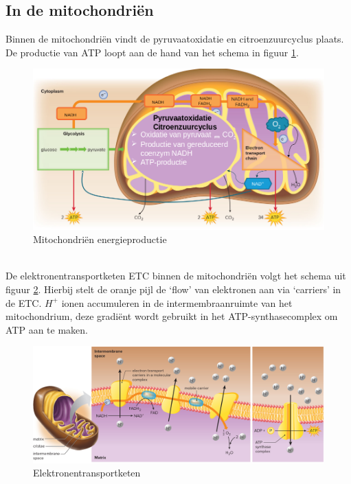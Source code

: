 \documentclass[a4paper,kul]{kulakarticle} %
\begin{document}
\subsection{In de mitochondriën}
Binnen de mitochondriën vindt de pyruvaatoxidatie en citroenzuurcyclus plaats. De productie van ATP loopt aan de hand van het schema in figuur \ref{fig:energieproductiemito}.
\begin{figure}[h]
	\centering
	\includegraphics[width=0.7\linewidth]{EnergieProductieMito}
	\caption[Mitochondriën energieproductie]{Mitochondriën energieproductie}
	\label{fig:energieproductiemito}
\end{figure}\\
De elektronentransportketen ETC binnen de mitochondriën volgt het schema uit figuur \ref{fig:elektrontransport}. Hierbij stelt de oranje pijl de `flow' van elektronen aan via `carriers' in de ETC. $H^+$ ionen accumuleren in de intermembraanruimte van het mitochondrium, deze gradiënt wordt gebruikt in het ATP-synthasecomplex om ATP aan te maken.
\begin{figure}[h]
	\centering
	\includegraphics[width=0.7\linewidth]{ElektronTransport}
	\caption[ETC]{Elektronentransportketen}
	\label{fig:elektrontransport}
\end{figure}
\newpage
\end{document}

